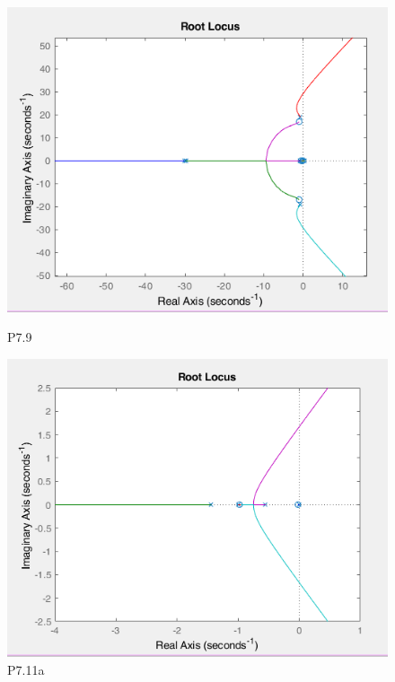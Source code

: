 \documentclass{article}
\begin{document}
\begin{center}
		\begin{figure}
			\centering
			\begin{minipage}{.5\textwidth}
				\centering
				\includegraphics[width=1.00\linewidth]{9}
				\caption{P7.9}
			\end{minipage}%
			\begin{minipage}{.5\textwidth}
				\centering
				\includegraphics[width=1.00\linewidth]{11a}
				\caption{P7.11a}
			\end{minipage}
		\end{figure}
	

\end{center}
\end{document}
